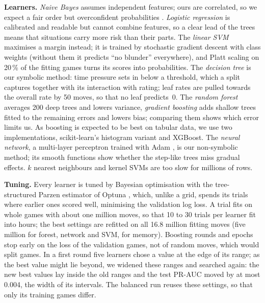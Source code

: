 \documentclass[a4paper,oneside,bibliography=totoc]{scrbook}
\newcommand{\stale}[1]{\textcolor{BurntOrange}{#1}}
\begin{document}
\textbf{Learners.} \emph{Naive Bayes} assumes independent features; ours are correlated, so we expect a fair
order but overconfident probabilities \cite{niculescu2005calibration}. \emph{Logistic regression} is calibrated
and readable but cannot combine features, so a clear lead of the trees means that situations carry more risk
than their parts. The \emph{linear SVM} \cite{cortes1995svm} maximises a margin instead; it is trained by
stochastic gradient descent with class weights (without them it predicts ``no blunder'' everywhere), and Platt
scaling \cite{platt1999} on 20\,\% of the fitting games turns its scores into probabilities. The \emph{decision
tree} \cite{breiman1984cart} is our symbolic method: time pressure sets in below a threshold, which a split
captures together with its interaction with rating; leaf rates are pulled towards the overall rate by 50 moves,
so that no leaf predicts~0. The \emph{random forest} \cite{breiman2001forests} averages 200 deep trees and
lowers variance, \emph{gradient boosting} \cite{friedman2001boosting} adds shallow trees fitted to the remaining
errors and lowers bias; comparing them shows which error limits us. As boosting is expected to be best on tabular
data, we use two implementations, scikit-learn's histogram variant \cite{ke2017lightgbm} and XGBoost. The
\emph{neural network}, a multi-layer perceptron trained with Adam \cite{kingma2015adam}, is our non-symbolic
method; its smooth functions show whether the step-like trees miss gradual effects. $k$ nearest neighbours and
kernel SVMs are too slow for millions of rows.

\textbf{Tuning.} Every learner is tuned by Bayesian optimisation with the tree-structured Parzen estimator
\cite{bergstra2011tpe} of Optuna \cite{akiba2019optuna}, which, unlike a grid, spends its trials where earlier
ones scored well, minimising the validation log loss. A trial fits on whole games with about one million moves,
so that 10 to 30 trials per learner fit into hours; the best settings are refitted on all \stale{16.8} million
fitting moves (five million for forest, network and SVM, for memory). Boosting rounds and epochs stop early on
the loss of the validation games, not of random moves, which would split games. In a first
round five learners chose a value at the edge of its range; as the best value might lie beyond, we widened these
ranges and searched again: the new best values lay inside the old ranges and the test PR-AUC moved by at most
0.004, the width of its intervals. The balanced run reuses these settings, so that only its training games differ.
\end{document}
